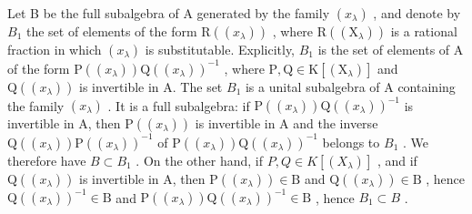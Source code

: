 Let B be the full subalgebra of A generated by the family \((x_{\lambda})\) , and denote by \(B_{1}\) the set of elements of the form \(\mathrm{R}((x_{\lambda}))\) , where \(\mathrm{R}((\mathrm{X}_{\lambda}))\) is a rational fraction in which \((x_{\lambda})\) is substitutable. Explicitly, \(B_{1}\) is the set of elements of A of the form \(\mathrm{P}((x_{\lambda}))\mathrm{Q}((x_{\lambda}))^{-1}\) , where \(\mathrm{P},\mathrm{Q}\in\mathrm{K}[(\mathrm{X}_{\lambda})]\) and \(\mathrm{Q}((x_{\lambda}))\) is invertible in A. The set \(B_{1}\) is a unital subalgebra of A containing the family \((x_{\lambda})\) . It is a full subalgebra: if \(\mathrm{P}((x_{\lambda}))\mathrm{Q}((x_{\lambda}))^{-1}\) is invertible in A, then \(\mathrm{P}((x_{\lambda}))\) is invertible in A and the inverse \(\mathrm{Q}((x_{\lambda}))\mathrm{P}((x_{\lambda}))^{-1}\) of \(\mathrm{P}((x_{\lambda}))\mathrm{Q}((x_{\lambda}))^{-1}\) belongs to \(B_{1}\) . We therefore have \(B\subset B_{1}\) . On the other hand, if \(P,Q\in K[(X_{\lambda})]\) , and if \(\mathrm{Q}((x_{\lambda}))\) is invertible in A, then \(\mathrm{P}((x_{\lambda}))\in\mathrm{B}\) and \(\mathrm{Q}((x_{\lambda}))\in\mathrm{B}\) , hence \(\mathrm{Q}((x_{\lambda}))^{-1}\in\mathrm{B}\) and \(\mathrm{P}((x_{\lambda}))\mathrm{Q}((x_{\lambda}))^{-1}\in\mathrm{B}\) , hence \(B_{1}\subset B\) .


